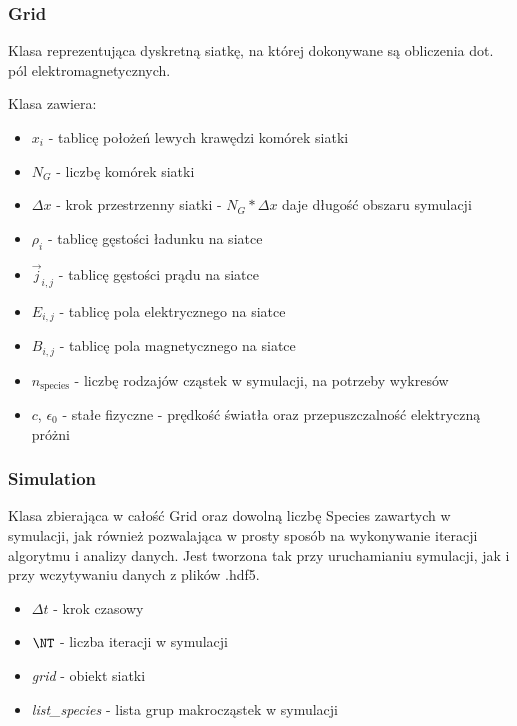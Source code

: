 
\subsubsection{Grid}
Klasa reprezentująca dyskretną siatkę, na której dokonywane są obliczenia dot. pól elektromagnetycznych.

Klasa zawiera:
\begin{itemize}
    \item $x_i$ - tablicę położeń lewych krawędzi komórek siatki
    \item $N_G$ - liczbę komórek siatki
    \item $\Delta x$ - krok przestrzenny siatki - $N_G * \Delta x$ daje długość obszaru symulacji
    \item $\rho_i$ - tablicę gęstości ładunku na siatce
    \item $\vec{j}_{i,j}$ - tablicę gęstości prądu na siatce
    \item $E_{i,j}$ - tablicę pola elektrycznego na siatce
    \item $B_{i,j}$ - tablicę pola magnetycznego na siatce
    \item $n_{\text{species}}$ - liczbę rodzajów cząstek w symulacji, na potrzeby wykresów
    \item $c$, $\epsilon_0$ - stałe fizyczne - prędkość światła oraz przepuszczalność elektryczną próżni %
\end{itemize}



\subsubsection{Simulation}
Klasa zbierająca w całość Grid oraz dowolną liczbę Species zawartych w symulacji, jak również
pozwalająca w prosty sposób na wykonywanie iteracji algorytmu i analizy danych. Jest tworzona tak przy
uruchamianiu symulacji, jak i przy wczytywaniu danych z plików .hdf5.
 
\begin{itemize}
\item $\Delta t$ - krok czasowy
\item $\NT$ - liczba iteracji w symulacji
\item \emph{grid} - obiekt siatki
\item \emph{list\_species} - lista grup makrocząstek w symulacji
\end{itemize}

